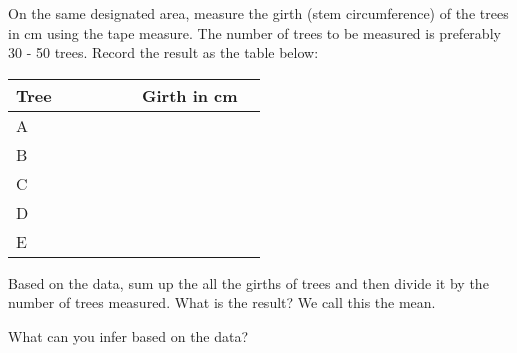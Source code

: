 \begin{myenumerate}
\item On the same designated area, measure the girth (stem circumference) of the trees in cm using
the tape measure. The number of trees to be measured is preferably 30 - 50 trees.
Record the result as the table below:

\begin{center}
\begin{tabular}{|>{\centering\arraybackslash}p{0.25\linewidth}|>{\centering\arraybackslash}p{0.25\linewidth}|}
\hline
Tree & Girth in cm\\
\hline
A & \\ \hline
B & \\ \hline
C & \\ \hline
D & \\ \hline
E & \\ \hline
\end{tabular}
\end{center}

Based on the data, sum up the all the girths of trees and then divide it by the number of trees
measured. What is the result? We call this the mean.

What can you infer based on the data?

\end{myenumerate}
